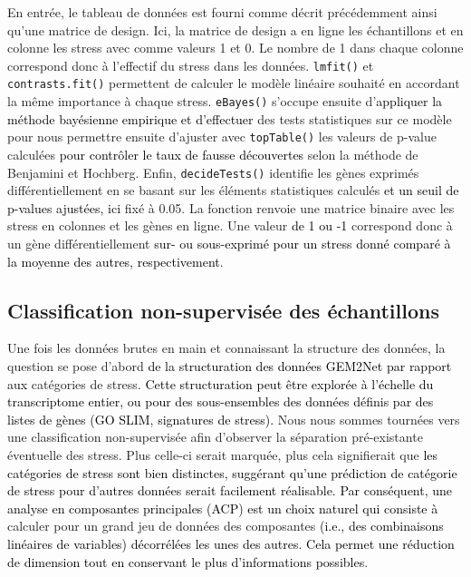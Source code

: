 \documentclass[twoside]{article}
\newcommand{\AR}[1]{\textcolor{black}{#1}}
\begin{document}
    \vspace{0.5cm}En entrée, le tableau de données est fourni comme décrit précédemment ainsi qu'une matrice de design. Ici, la matrice de design a en ligne les échantillons et en colonne les stress avec comme valeurs 1 et 0. Le nombre de 1 dans chaque colonne correspond donc à l'effectif du stress dans les données. \texttt{lmfit()} et \texttt{contrasts.fit()} permettent de calculer le modèle linéaire souhaité en accordant la même importance à chaque stress. \texttt{eBayes()} s'occupe ensuite d'\AR{appliquer la méthode bayésienne empirique et d'effectuer} des tests statistiques sur ce modèle pour nous permettre ensuite d'ajuster avec \texttt{topTable()} les valeurs de p-value calculées \AR{pour contrôler le taux de fausse découvertes} selon la méthode de Benjamini et Hochberg. Enfin, \texttt{decideTests()} identifie les gènes exprimés différentiellement en se basant sur les éléments statistiques calculés \AR{et un seuil de p-values ajustées, ici} fixé à 0.05. La fonction renvoie une matrice binaire avec les stress en colonnes et les gènes en ligne. Une valeur \AR{de 1 ou -1} correspond donc à un gène différentiellement \AR{sur- ou sous-exprimé pour un stress donné comparé à la moyenne des autres, respectivement}.
    
    
    \subsection{Classification non-supervisée des échantillons}
    
    \vspace{0.3cm}Une fois les données brutes en main et connaissant la structure des données, la question se pose d'abord \AR{de la structuration des données GEM2Net par rapport aux} catégories de stress. \AR{Cette structuration peut être explorée à l'échelle du transcriptome entier, ou pour des sous-ensembles des données définis par des listes de gènes (GO SLIM, signatures de stress).} Nous nous sommes tournées vers une classification non-supervisée afin d'observer la séparation pré-existante éventuelle des stress.  
    Plus celle-ci serait marquée, plus cela signifierait que \AR{les catégories de stress sont bien distinctes, suggérant qu'une prédiction de catégorie de stress pour d'autres données serait facilement réalisable. Par conséquent, une analyse en composantes principales (ACP) est un choix naturel qui consiste à} calculer pour un grand jeu de données des composantes \AR{(i.e., des combinaisons linéaires de variables) décorrélées les unes des autres. Cela permet une réduction de dimension tout en conservant le plus d'informations possibles}.
    
\end{document}
